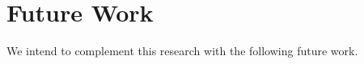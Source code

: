 \begin{comment}
\section{Limitations}
\label{sec:limitarions}

We carefully conducted our study to propose JReuse. For instance, we based our study in previous work and conducted two evaluations to assess the effectiveness of JReuse. However, there are some limitations described as follows.

\begin{itemize}
\item The proposed method is applicable to object-oriented systems only,

\item We lack a survey with experienced developers regarding the most frequent methods provided by JReuse,

\item Since the proposed method relies on lexical analysis, it does not consider similarity between names of entities in the semantic level. Therefore, considering two classes named as \texttt{Car} and \texttt{Automobile}, the tool is not able to identify both names as similar,

\item The method proposed was designed for analysis in a given natural language, because it relies on lexical analysis. That is, the input systems has to be written using the same language, such as English or Portuguese.
\end{itemize}
\end{comment}

\section{Future Work}
\label{sec:futurework}

We intend to complement this research with the following future work.

